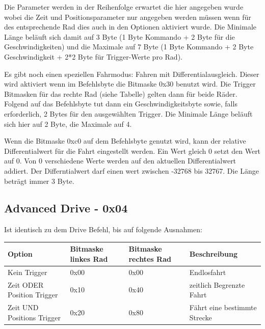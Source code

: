 \documentclass[a4paper]{article}
\begin{document}
	Die Parameter werden in der Reihenfolge erwartet die hier angegeben wurde wobei die Zeit und Positionsparameter nur
	angegeben werden müssen wenn für des entsprechende Rad dies auch in den Optionen aktiviert wurde.
	Die Minimale Länge beläuft sich damit auf 3 Byte (1 Byte Kommando + 2 Byte für die Geschwindigkeiten) und die
	Maximale auf 7 Byte (1 Byte Kommando + 2 Byte Geschwindigkeit + 2*2 Byte für Trigger-Werte pro Rad).

	Es gibt noch einen speziellen Fahrmodus: Fahren mit Differentialausgleich. Dieser wird aktiviert wenn im Befehlsbyte
	die Bitmaske 0x30 benutzt wird. Die Trigger Bitmasken für das rechte Rad (siehe Tabelle) gelten dann für beide Räder.
	Folgend auf das Befehlsbyte tut dann ein Geschwindigkeitsbyte sowie, falls erforderlich, 2 Bytes für den ausgewählten
	Trigger. Die Minimale Länge beläuft sich hier auf 2 Byte, die Maximale auf 4.

	Wenn die Bitmaske 0xc0 auf dem Befehlsbyte genutzt wird, kann der relative Differentialwert für die Fahrt eingestellt
	werden. Ein Wert gleich 0 setzt den Wert auf 0. Von 0 verschiedene Werte werden auf den aktuellen Differentialwert
	addiert. Der Differntialwert darf einen wert zwischen -32768 bis 32767. Die Länge beträgt immer 3 Byte.

	\subsection{Advanced Drive - 0x04}

	Ist identisch zu dem Drive Befehl, bis auf folgende Ausnahmen:
	
	\begin{tabularx}{\linewidth}{|l|l|l|X|}
		\hline
		\textbf{Option} & \textbf{Bitmaske linkes Rad} & \textbf{Bitmaske rechtes Rad} & \textbf{Beschreibung} \\
		\hline
		\hline
		Kein Trigger				& 0x00						   & 0x00						   & Endlosfahrt \\
		\hline
		Zeit ODER Position Trigger	& 0x10						   & 0x40						   & zeitlich Begrenzte Fahrt\\
		\hline
		Zeit UND Positions Trigger  & 0x20						   & 0x80						   & Fährt eine bestimmte Strecke \\
		\hline
	\end{tabularx}
\end{document}
